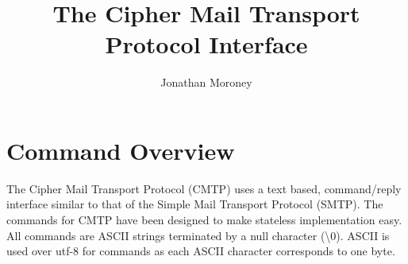 \documentclass[a4paper,11pt]{article}
\title{The Cipher Mail Transport Protocol Interface}
\author{Jonathan Moroney}
\begin{document}
\maketitle
\tableofcontents


\section{Command Overview}
The Cipher Mail Transport Protocol (CMTP) uses a text based, command/reply interface similar to that of the Simple Mail Transport Protocol (SMTP). The commands for CMTP have been designed to make stateless implementation easy. All commands are ASCII strings terminated by a null character (\textbackslash 0). ASCII is used over utf-8 for commands as each ASCII character corresponds to one byte.
%
%
%
\end{document}
